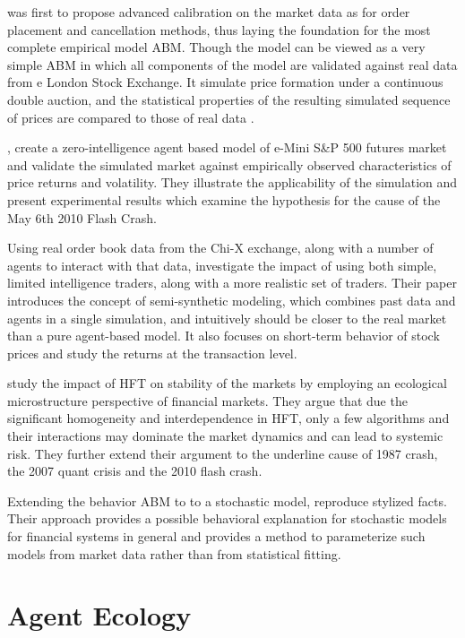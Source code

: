 \documentclass[12pt,a4paper]{article}
\numberwithin{equation}{section}
\numberwithin{figure}{section}
\numberwithin{table}{section}
\begin{document}
\citet{mike2008} was first to propose advanced calibration on the market data as for order
placement and cancellation methods, thus laying the foundation for the most complete empirical model ABM. Though the model can be viewed as a very simple ABM in which all components of the model are validated against real data from e London Stock Exchange. It simulate price formation under a continuous double auction, and the statistical properties of the resulting simulated sequence of prices are compared to those of real data \citep{mike2008}.

\citet{paddrik2012}, create a zero-intelligence agent based model of e-Mini S\&P 500 futures market and validate the simulated market against empirically observed characteristics of price returns and volatility. They illustrate
the applicability of the simulation and present experimental results which examine the hypothesis for the cause of the May 6th 2010 Flash Crash.

Using real order book data from the Chi-X exchange, along with a number of agents to interact with that data, \citet{panayi2012} investigate the impact of using both simple, limited intelligence traders, along with a more realistic set of traders. Their paper introduces the concept of semi-synthetic modeling, which combines past data and agents in a single simulation, and intuitively should be closer to the real market than a pure agent-based model. It also focuses on short-term behavior of stock prices and study the returns at the transaction level.

\citet{farmer2011} study the impact of HFT on stability of the markets by employing an ecological microstructure perspective of financial markets. They argue that due the significant homogeneity and interdependence in HFT, only a few algorithms and their interactions may dominate the market dynamics and can lead to systemic risk. They further extend their argument to the underline cause of 1987 crash, the 2007 quant crisis and the 2010 flash crash.

Extending the behavior ABM to to a stochastic model, \citet{FengLiPodobnikPreisStanley2012} reproduce stylized facts. Their approach provides a possible behavioral explanation for stochastic models for financial systems
in general and provides a method to parameterize such models from market data rather than from statistical fitting.


\section{Agent Ecology}\label{sec:ae}
\end{document}
